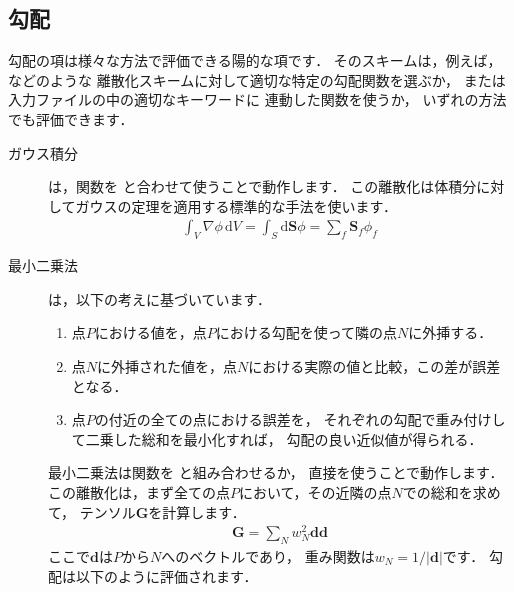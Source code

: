 \subsection{勾配}
\label{ssec:2.4.6}
%  
勾配の項は様々な方法で評価できる陽的な項です．
そのスキームは，例えば，などのような
離散化スキームに対して適切な特定の勾配関数を選ぶか，
または入力ファイルの中の適切なキーワードに
連動した関数を使うか，
いずれの方法でも評価できます．
\begin{description}
 \item[ガウス積分] は，関数を
            と合わせて使うことで動作します．
            この離散化は体積分に対してガウスの定理を適用する標準的な手法を使います．
            \begin{align}
             \label{eq:2.25}
             \int_{V}\nabla\phi\,\mathrm{d}V
             = \int_{S}\mathrm{d}\bm{S}\phi
             = \sum_{f}\bm{S}_{f}\phi_{f}
            \end{align}
%  
 \item[最小二乗法] は，以下の考えに基づいています．
            \begin{enumerate}
             \item 点$P$における値を，点$P$における勾配を使って隣の点$N$に外挿する．
             \item 点$N$に外挿された値を，点$N$における実際の値と比較，この差が誤差となる．
             \item 点$P$の付近の全ての点における誤差を，
                   それぞれの勾配で重み付けして二乗した総和を最小化すれば，
                   勾配の良い近似値が得られる．
            \end{enumerate}
            最小二乗法は関数を
            と組み合わせるか，
            直接を使うことで動作します．
            この離散化は，まず全ての点$P$において，その近隣の点$N$での総和を求めて，
            テンソル$\bm{G}$を計算します．
            \begin{align}
             \label{eq:2.26}
             \bm{G} = \sum_{N}w_{N}^{2}\bm{d}\bm{d}
            \end{align}
            ここで$\bm{d}$は$P$から$N$へのベクトルであり，
            重み関数は$w_{N} = 1/|\bm{d}|$です．
            勾配は以下のように評価されます．
            \begin{align}

\end{align}
\end{description}
